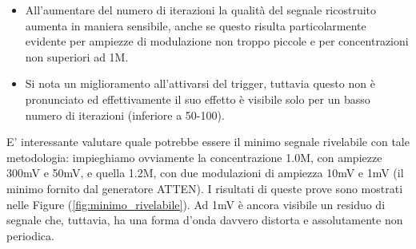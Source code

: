 \documentclass[10pt,letterpaper]{article}
\begin{document}
\begin{itemize}
\item All'aumentare del numero di iterazioni la qualità del segnale ricostruito aumenta in maniera sensibile, anche se questo risulta particolarmente evidente per ampiezze di modulazione non troppo piccole  e per concentrazioni non superiori ad 1M.

\item Si nota un miglioramento all'attivarsi del trigger, tuttavia questo non è pronunciato ed effettivamente il suo effetto è visibile solo per un basso numero di iterazioni (inferiore a 50-100). 
\end{itemize}

E' interessante valutare quale potrebbe essere il minimo segnale rivelabile con tale metodologia: impieghiamo ovviamente la concentrazione 1.0M, con ampiezze 300mV e 50mV, e quella 1.2M, con due modulazioni di ampiezza 10mV e 1mV (il minimo fornito dal generatore ATTEN). I risultati di queste prove sono mostrati nelle Figure (\ref{fig:minimo_rivelabile}). Ad 1mV è ancora visibile un residuo di segnale che, tuttavia, ha una forma d'onda davvero distorta e assolutamente non periodica.
\end{document}
